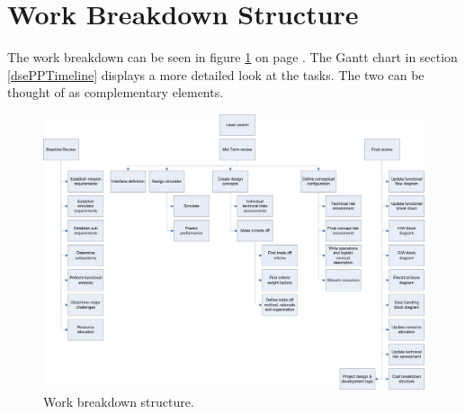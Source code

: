 \section{Work Breakdown Structure}
\label{dsePPWBS}
The work breakdown can be seen in figure \ref{wbs} on page \pageref{wbs}. The Gantt chart in section \ref{dsePPTimeline} displays a more detailed look at the tasks. The two can be thought of as complementary elements.

\begin{figure} [H]
\begin{center}
\includegraphics[width=1.2\textwidth, angle=90]{chapters/img/Work_break_down_structure.jpg}
\end{center}
\caption{Work breakdown structure.}
\label{wbs}
\end{figure}
